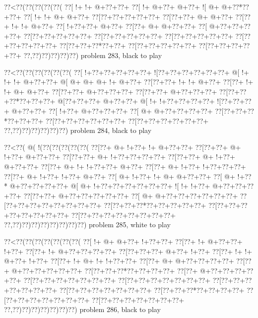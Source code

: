 \vbox{\vbox{\goo
\0??<\0??(\0??(\0??(\0??(\0??(
\0??[\- !+\- !+\- @+\0??+\0??+
\0??[\- !+\- @+\0??+\- @+\0??+
\- ![\- @+\- @+\0??*\0??+\0??+
\0??[\- !+\- !+\- @+\- @+\0??+
\0??[\0??+\0??+\0??+\0??+\0??+
\0??[\0??+\0??+\- @+\- @+\0??+
\0??[\0??+\- !+\- !+\- @+\0??+
\0??[\- !+\0??+\0??+\- @+\0??+
\0??[\0??+\- @+\- @+\0??+\0??+
\0??[\- @+\0??+\0??+\0??+\0??+
\0??[\0??+\0??+\0??+\0??+\0??+
\0??[\0??+\0??+\0??+\0??+\0??+
\0??[\0??+\0??+\0??+\0??+\0??+
\0??[\0??+\0??+\0??+\0??+\0??+
\0??[\0??+\0??+\0??*\0??+\0??+
\0??[\0??+\0??+\0??+\0??+\0??+
\0??[\0??+\0??+\0??+\0??+\0??+
\0??,\0??)\0??)\0??)\0??)\0??)
}
\hfil problem 283, black to play\hfil\break
}

\vbox{\vbox{\goo
\0??<\0??(\0??(\0??(\0??(\0??(\0??(
\0??[\- !+\0??+\0??+\0??+\0??+\0??+
\- ![\0??+\0??+\0??+\0??+\0??+\0??+
\- @[\- !+\- !+\- !+\- @+\0??+\0??+
\- @[\- @+\- @+\- @+\- !+\- @+\0??+
\0??[\0??+\0??+\- !+\- !+\- @+\0??+
\0??[\0??+\- !+\- !+\- @+\- @+\0??+
\0??[\0??+\0??+\- @+\0??+\0??+\0??+
\0??[\0??+\0??+\- @+\0??+\0??+\0??+
\0??[\0??+\0??+\0??*\0??+\0??+\0??+
\- @[\0??+\0??+\0??+\- @+\0??+\0??+
\- @[\- !+\- !+\0??+\0??+\0??+\0??+
\- ![\0??+\0??+\0??+\- @+\0??+\0??+
\0??[\- !+\0??+\- @+\0??+\0??+\0??+
\0??[\- @+\- @+\0??+\0??+\0??+\0??+
\0??[\0??+\0??+\0??*\0??+\0??+\0??+
\0??[\0??+\0??+\0??+\0??+\0??+\0??+
\0??[\0??+\0??+\0??+\0??+\0??+\0??+
\0??,\0??)\0??)\0??)\0??)\0??)\0??)
}
\hfil problem 284, black to play\hfil\break
}

\vbox{\vbox{\goo
\0??<\0??(\- @(\- !(\0??(\0??(\0??(\0??(\0??(
\0??[\0??+\- @+\- !+\0??+\- !+\- @+\0??+\0??+
\0??[\0??+\0??+\- @+\- !+\0??+\- @+\0??+\0??+
\0??[\0??+\0??+\- @+\- !+\0??+\0??+\0??+\0??+
\0??[\0??+\0??+\- @+\- !+\0??+\- @+\0??+\0??+
\0??[\0??+\- @+\- !+\- !+\0??+\0??+\- @+\0??+
\0??[\0??+\- @+\- !+\0??+\- !+\0??+\0??+\0??+
\0??[\0??+\- @+\- !+\0??+\- !+\0??+\- @+\0??+
\0??[\- @+\- !+\0??+\- !+\- @+\- @+\0??+\0??+
\0??[\- @+\- !+\0??*\- @+\0??+\0??+\0??+\0??+
\- @[\- @+\- !+\0??+\0??+\0??+\0??+\0??+\0??+
\- ![\- !+\- !+\0??+\- @+\0??+\0??+\0??+\0??+
\0??[\0??+\0??+\- @+\0??+\0??+\0??+\0??+\0??+
\0??[\- @+\- @+\0??+\0??+\0??+\0??+\0??+\0??+
\0??[\0??+\0??+\0??+\0??+\0??+\0??+\0??+\0??+
\0??[\0??+\0??+\0??*\0??+\0??+\0??+\0??+\0??+
\0??[\0??+\0??+\0??+\0??+\0??+\0??+\0??+\0??+
\0??[\0??+\0??+\0??+\0??+\0??+\0??+\0??+\0??+
\0??,\0??)\0??)\0??)\0??)\0??)\0??)\0??)\0??)
}
\hfil problem 285, white to play\hfil\break
}

\vbox{\vbox{\goo
\0??<\0??(\0??(\0??(\0??(\0??(\0??(\0??(
\0??[\- !+\- @+\- @+\0??+\- !+\0??+\0??+
\0??[\0??+\- !+\- @+\0??+\0??+\- !+\0??+
\0??[\0??+\- !+\- @+\0??+\0??+\0??+\0??+
\0??[\0??+\0??+\0??+\- @+\0??+\- !+\0??+
\0??[\0??+\- !+\- !+\- @+\0??+\- !+\0??+
\0??[\0??+\- !+\- @+\- !+\- !+\0??+\0??+
\0??[\0??+\- @+\- @+\0??+\0??+\0??+\0??+
\0??[\0??+\- @+\0??+\0??+\0??+\0??+\0??+
\0??[\0??+\0??+\0??*\0??+\0??+\0??+\0??+
\0??[\0??+\- @+\0??+\0??+\0??+\0??+\0??+
\0??[\0??+\0??+\0??+\0??+\0??+\0??+\0??+
\0??[\0??+\0??+\0??+\0??+\0??+\0??+\0??+
\0??[\0??+\0??+\0??+\0??+\0??+\0??+\0??+
\0??[\0??+\0??+\0??+\0??+\0??+\0??+\0??+
\0??[\0??+\0??+\0??*\0??+\0??+\0??+\0??+
\0??[\0??+\0??+\0??+\0??+\0??+\0??+\0??+
\0??[\0??+\0??+\0??+\0??+\0??+\0??+\0??+
\0??,\0??)\0??)\0??)\0??)\0??)\0??)\0??)
}
\hfil problem 286, black to play\hfil\break
}

